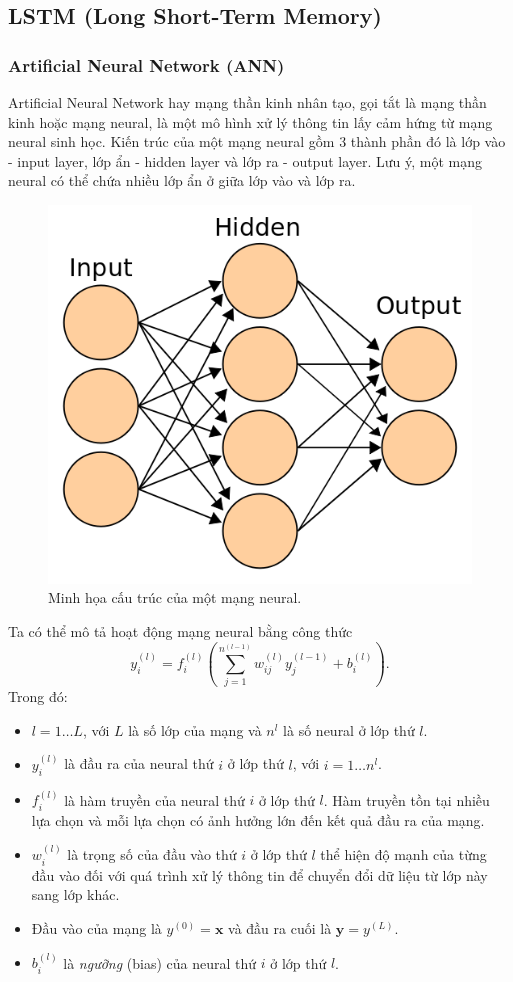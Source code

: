 \subsection{LSTM (Long Short-Term Memory)}
    \subsubsection{Artificial Neural Network (ANN)}
    Artificial Neural Network hay mạng thần kinh nhân tạo, gọi tắt là mạng thần kinh hoặc mạng neural, là một mô hình xử lý thông tin lấy cảm hứng từ  mạng neural sinh học. Kiến trúc của một mạng neural gồm 3 thành phần đó là lớp vào - input layer, lớp ẩn - hidden layer và lớp ra - output layer. Lưu ý, một mạng neural có thể chứa nhiều lớp ẩn ở giữa lớp vào và lớp ra.
    \begin{figure}[htp]
        \centering
        \includegraphics[width=6 cm]{images/ann.png}
        \caption{Minh họa cấu trúc của một mạng neural. \cite{ann_struct}}
        \label{fig:ann_structure}
    \end{figure}
    
    Ta có thể mô tả hoạt động mạng neural bằng công thức
    \begin{equation} \label{ann_eqn}
        y^{(l)}_i = f^{(l)}_i\left(\sum_{j=1}^{n^{(l-1)}}w^{(l)}_{ij}y^{(l-1)}_{j} + b^{(l)}_i\right).
    \end{equation}
    Trong đó:
    \begin{itemize}
        \item $l=1\dotsc L$, với $L$ là số lớp của mạng và $n^l$ là số neural ở lớp thứ $l$.
        \item $y^{(l)}_i$ là đầu ra của neural thứ $i$ ở lớp thứ $l$, với $i = 1\dotsc n^{l}$.
        \item $f^{(l)}_i$ là hàm truyền của neural thứ $i$ ở lớp thứ $l$. Hàm truyền tồn tại nhiều lựa chọn và mỗi lựa chọn có ảnh hưởng lớn đến kết quả đầu ra của mạng.
        \item $w_{i}^{(l)}$ là trọng số của đầu vào thứ $i$ ở lớp thứ $l$ thể hiện độ mạnh của từng đầu vào đối với quá trình xử lý thông tin để chuyển đổi dữ liệu từ lớp này sang lớp khác.
        \item Đầu vào của mạng là $y^{(0)} = \textbf{x}$ và đầu ra cuối là $\textbf{y} = y^{(L)}$.
        \item $b^{(l)}_i$ là \textit{ngưỡng} (bias) của neural thứ $i$ ở lớp thứ $l$.
    \end{itemize}
    
